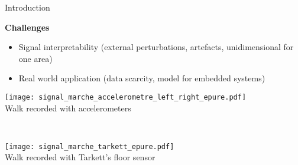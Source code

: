 \begin{frame}{Introduction}
\begin{minipage}[t]{0.47\linewidth}
        \medskip
        \centering\textbf{Challenges}
        \begin{itemize}
            \item Signal interpretability (external perturbations, artefacts, unidimensional for one area)
            \item Real world application (data scarcity, model for embedded systems)
        \end{itemize}
        \centering
        \begin{minipage}[t]{0.9\linewidth}
            \vspace{0.5pt}
            \centering
            \texttt{[image: signal\_marche\_accelerometre\_left\_right\_epure.pdf]}\\
            {\small Walk recorded with accelerometers}
        \end{minipage}\\
        \smallskip
        \begin{minipage}[t]{0.9\linewidth}
            \vspace{0pt}
            \centering
            \texttt{[image: signal\_marche\_tarkett\_epure.pdf]}\\
            {\small Walk recorded with Tarkett's floor sensor}
        \end{minipage}
        

\end{minipage}
\end{frame}
